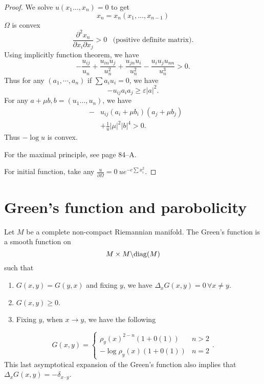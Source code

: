 \begin{proof}
We solve $ u ( x_1 \ldots, x_n) = 0 $ to get 
%
\[ x _n = x_n (x _1 , \ldots , x _{n-1} ) \]
%
$ \Omega$ is convex 
%
\[ \frac{\partial ^ 2 x _n }{\partial x_i \partial x_j} > 0 \;\;\;\mbox{(positive definite matrix)}.\]
%
Using implicitly function theorem, we have 
%
\[ -\frac{u_{ij}}{u_n} + \frac{u_{in} u_j}{u^2_n} + \frac{u_{jn} u_i}{u^2_n} - \frac{u_i u_j u_{nn}}{u_n^3} > 0 .\]
%
Thus for any $ (a _1, \cdots , a_n) $ if $ \sum a _i u_i = 0 $, we have
%
\[ - u _{ij} a _i a_j \geq \varepsilon |a|^2.\]
%
For any $a + \mu b , b = (u _1 \ldots, u_n ) $, we have 
\begin{eqnarray*}
& - & u_{ij} (a_i + \mu b_i )( a_j + \mu b_j ) \\
&& + \frac{1}{u} |\mu | ^2 |b| ^4 > 0 .
\end{eqnarray*}
Thus $ - \log  u$ is convex.

For the maximal principle, see page 84--A. 

For initial function, take any $ \frac{u}{\partial \Omega } = 0 \   u e ^{- c \sum x_i ^2}$.

\end{proof}






\section{Green's function and parobolicity}\label{Green_function}

Let $M$ be a complete non-compact Riemannian manifold. The Green's function is a smooth function on 
\[ M \times M  \backslash {\rm diag} (M) \]
%
such that 
%
\begin{enumerate}
\item $G (x, y)   =   G (y, x) $ and fixing $ y$, we have $ \Delta _x G (x, y)  = 0 \, \forall x \neq y $. 
\item $G(x, y) \geq 0 $.
\item Fixing $y$, when $ x \rightarrow y$, we have the following 
  \end{enumerate} 
%
\[ G(x, y) = \left\{ \begin{array}{ll} \rho _y (x) ^{2-n} (1 + 0(1) )& n>2 \\
- \log \rho_y (x) (1 + 0(1)) & n = 2 \end{array} \right. .\]
%
This last asymptotical expansion of the Green's function also implies that $ \Delta _x G(x, y) = - \delta _{x \cdot y} $.

